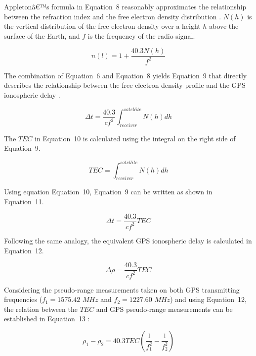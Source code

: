 \documentclass[sn-mathphys-num]{sn-jnl}%
\begin{document}
Appletonâ€™s formula in Equation~8 reasonably approximates the relationship between the refraction index and the free electron density distribution \cite{davies1990ionospheric, spilker1996global}. $N(h)$ is the vertical distribution of the free electron density over a height $h$ above the surface of the Earth, and $f$ is the frequency of the radio signal.

\begin{equation}
	n(l) = 1 + \frac{40.3 N(h)}{f^{2}}
	\label{eqn:8}
\end{equation}

The combination of Equation~6 and Equation~8 yields Equation~9 that directly describes the relationship between the free electron density profile and the GPS ionospheric delay \cite{spilker1996global}.

\begin{equation}
	\Delta t = \frac{40.3}{c f^{2}} \int_{receiver}^{satellite} N(h)dh
	\label{eqn:9}
\end{equation}

The $TEC$ \cite{spilker1996global} in Equation~10 is calculated using the integral on the right side of Equation~9.

\begin{equation}
	TEC = \int_{receiver}^{satellite} N(h)dh
	\label{eqn:10}
\end{equation}

Using equation Equation~10, Equation~9 can be written as shown in Equation~11.

\begin{equation}
	\Delta t = \frac{40.3}{c f^{2}} TEC
	\label{eqn:11}
\end{equation}

Following the same analogy, the equivalent GPS ionospheric delay is calculated in Equation~12.

\begin{equation}
	\Delta \rho = \frac{40.3}{c f^{2}} TEC
	\label{eqn:12}
\end{equation}

Considering the pseudo-range measurements taken on both GPS transmitting frequencies ($f_{1}=1575.42$ $MHz$ and $f_{2}=1227.60$ $MHz$) and using Equation~12, the relation between the $TEC$ and GPS pseudo-range measurements can be established in Equation~13 \cite{spilker1996global}:
 
\begin{equation}
	\rho_{1} - \rho_{2} = 40.3 TEC \left( \frac{1}{f_{1}^{2}} - \frac{1}{f_{2}^{2}} \right)
	\label{eqn:13}
\end{equation}
\end{document}
